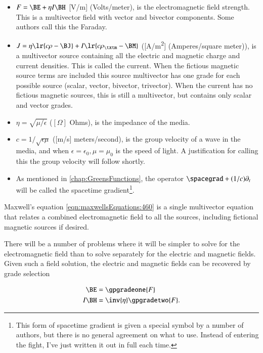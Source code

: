 \begin{itemize}
\item \( F = \BE + \eta I \BH \) [\si{V/m}] (Volts/meter), is the electromagnetic field strength.
This is a multivector field with vector and bivector components.  Some authors call this the Faraday.
\item \( J = \eta \lr{ c \rho - \BJ } + I \lr{ c \rho_\txtm - \BM } \) ([\si{A/m^2}] (Amperes/square meter)),
is a multivector source containing all the electric and magnetic charge and current densities.  This is called the current.
When the fictious magnetic source terms are included this source multivector has one grade for each possible source (scalar, vector, bivector, trivector).  When the current has no fictious magnetic sources, this is still a multivector, but contains only scalar and vector grades.
\item \( \eta = \sqrt{\mu/\epsilon} \) (\( [\Omega] \) Ohms), is the impedance of the media.
\item \( c = 1/\sqrt{\epsilon\mu} \) ([\si{m/s}] meters/second), is the group velocity of a wave in the media, and when \( \epsilon = \epsilon_0, \mu = \mu_0 \) is the speed of light.
A justification for calling this the group velocity will follow shortly.
\item As mentioned in \cref{chap:GreensFunctions}, the operator \( \spacegrad + (1/c) \partial_t \) will be called the spacetime gradient\footnote{
This form of spacetime gradient is given a special symbol by a number of authors, but there is no general agreement on what to use.
Instead of entering the fight, I've just written it out in full each time.}.
\end{itemize}

Maxwell's equation \cref{eqn:maxwellsEquations:460} is a
single multivector equation that relates a combined electromagnetic field to all the sources, including fictional magnetic sources if desired.

There will be a number of problems where it will be simpler to solve for the electromagnetic field than to solve separately for the electric and magnetic fields.
Given such a field solution, the electric and magnetic fields can be recovered by grade selection

\begin{dmath}\label{eqn:isotropicMaxwells:480}
\begin{aligned}
\BE &= \gpgradeone{F} \\
I \BH &= \inv{\eta} \gpgradetwo{F}.
\end{aligned}
\end{dmath}
